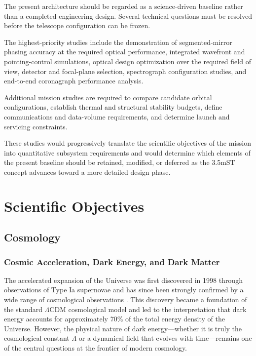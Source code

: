 The present architecture should be regarded as a science-driven baseline
rather than a completed engineering design. Several technical questions
must be resolved before the telescope configuration can be frozen.

The highest-priority studies include the demonstration of segmented-mirror
phasing accuracy at the required optical performance, integrated wavefront
and pointing-control simulations, optical design optimization over the
required field of view, detector and focal-plane selection, spectrograph
configuration studies, and end-to-end coronagraph performance analysis.

Additional mission studies are required to compare candidate orbital
configurations, establish thermal and structural stability budgets, define
communications and data-volume requirements, and determine launch and
servicing constraints.

These studies would progressively translate the scientific objectives of
the mission into quantitative subsystem requirements and would determine
which elements of the present baseline should be retained, modified, or
deferred as the 3.5mST concept advances toward a more detailed design phase.



\chapter{Scientific Objectives}
\section{Cosmology}\label{cosmology}

\subsection{Cosmic Acceleration, Dark Energy, and Dark Matter}\label{cosmic-acceleration-dark-energy-and-dark-matter}

The accelerated expansion of the Universe was first discovered in 1998 through observations of Type Ia supernovae and has since been strongly confirmed by a wide range of cosmological observations \cite{riess98,perlmutter99}. This discovery became a foundation of the standard $\Lambda$CDM cosmological model and led to the interpretation that dark energy accounts for approximately 70\% of the total energy density of the Universe. However, the physical nature of dark energy---whether it is truly the cosmological constant $\Lambda$ or a dynamical field that evolves with time---remains one of the central questions at the frontier of modern cosmology.

